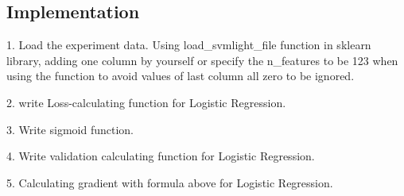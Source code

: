 \documentclass[journal, a4paper]{IEEEtran}
\begin{document}
\subsection{Implementation}

	


1. Load the experiment data. Using load\_svmlight\_file function in sklearn library, adding one column by yourself or specify the n\_features to be 123 when using the function to avoid values of last column all zero to be ignored.\par
2. write Loss-calculating function for Logistic Regression.\par
\lstset{language=python}
3. Write sigmoid function.\par

4. Write validation calculating function for Logistic Regression.\par

5. Calculating gradient with formula above for Logistic Regression.
\end{document}

